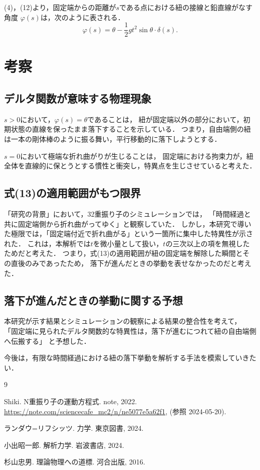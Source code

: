 \documentclass[]{jlreq}
\begin{document}
(4)，(12)より，固定端からの距離が$s$である点における紐の接線と鉛直線がなす角度
$\varphi \left(s\right)$は，次のように表される．
\begin{equation}
  \varphi\left(s\right) = \theta - \frac{1}{2} g t^2 \sin \theta \cdot \delta \left(s\right).
\end{equation}



\section{考察}
\subsection{デルタ関数が意味する物理現象}
$s > 0$において，$\varphi\left(s\right) = \theta$であることは，
紐が固定端以外の部分において，初期状態の直線を保ったまま落下することを示している．
つまり，自由端側の紐は一本の剛体棒のように振る舞い，平行移動的に落下しようとする．

$s = 0$において極端な折れ曲がりが生じることは，
固定端における拘束力が，紐全体を直線的に保とうとする慣性と衝突し，特異点を生じさせていると考えた．



\subsection{式(13)の適用範囲がもつ限界}
「研究の背景」において，32重振り子のシミュレーションでは，
「時間経過と共に固定端側から折れ曲がってゆく」と観察していた．
しかし，本研究で導いた極限では，「固定端付近で折れ曲がる」という一箇所に集中した特異性が示された．
これは，本解析では$t$を微小量として扱い，$t$の三次以上の項を無視したためだと考えた．
つまり，式(13)の適用範囲が紐の固定端を解除した瞬間とその直後のみであったため，
落下が進んだときの挙動を表せなかったのだと考えた．



\subsection{落下が進んだときの挙動に関する予想}
本研究が示す結果とシミュレーションの観察による結果の整合性を考えて，
「固定端に見られたデルタ関数的な特異性は，落下が進むにつれて紐の自由端側へ伝搬する」
と予想した．

今後は，有限な時間経過における紐の落下挙動を解析する手法を模索していきたい．



\begin{thebibliography}{9}
  \item Shiki. N重振り子の運動方程式. note, 2022. \url{https://note.com/sciencecafe_mc2/n/ne5077e5a62f1}, (参照 2024-05-20).
  \item ランダウ=リフシッツ. 力学. 東京図書, 2024.
  \item 小出昭一郎. 解析力学. 岩波書店, 2024.
  \item 杉山忠男. 理論物理への道標. 河合出版, 2016.
\end{thebibliography}
\end{document}
